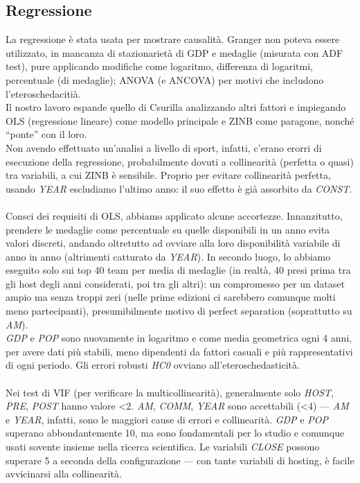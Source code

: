 \subsection{Regressione}\label{sec:methods_regression}

La regressione è stata usata per mostrare causalità. Granger non poteva essere
utilizzato, in mancanza di stazionarietà di GDP e medaglie (misurata con ADF
test), pure applicando modifiche come logaritmo, differenza di logaritmi,
percentuale (di medaglie); ANOVA (e ANCOVA) per motivi che includono
l'eteroschedacitià.\\

Il nostro lavoro espande quello di Csurilla\cite{csurillaLessObviousEffect2023}
analizzando altri fattori e impiegando OLS (regressione lineare) come modello
principale e ZINB come paragone, nonché ``ponte'' con il loro.\\
Non avendo effettuato un'analisi a livello di sport, infatti, c'erano erorri di
esecuzione della regressione, probabilmente dovuti a collinearità (perfetta o
quasi) tra variabili, a cui ZINB è sensibile. Proprio per evitare collinearità
perfetta, usando \textit{YEAR} escludiamo l'ultimo anno: il suo effetto è già
assorbito da \textit{CONST}.\\
\\
Consci dei requisiti di OLS, abbiamo applicato alcune accortezze. Innanzitutto,
prendere le medaglie come percentuale su quelle disponibili in un anno evita
valori discreti, andando oltretutto ad ovviare alla loro disponibilità variabile
di anno in anno (altrimenti catturato da \textit{YEAR}). In secondo luogo, lo
abbiamo eseguito solo sui top 40 team per media di medaglie (in realtà, 40 presi
prima tra gli host degli anni considerati, poi tra gli altri): un compromesso
per un dataset ampio ma senza troppi zeri (nelle prime edizioni ci sarebbero
comunque molti meno partecipanti), presumibilmente motivo di perfect
separation\cite{WikipediaSeparation} (soprattutto su \textit{AM}).\\
\textit{GDP} e \textit{POP} sono nuovamente in logaritmo e come media geometrica
ogni 4 anni, per avere dati più stabili, meno dipendenti da fattori casuali e
più rappresentativi di ogni periodo. Gli errori robusti \textit{HC0} ovviano
all'eteroschedasticità.\\
\\


Nei test di VIF (per verificare la multicollinearità), generalmente solo
\textit{HOST}, \textit{PRE}, \textit{POST} hanno valore <2. \textit{AM},
\textit{COMM}, \textit{YEAR} sono accettabili (<4) --- \textit{AM} e
\textit{YEAR}, infatti, sono le maggiori cause di errori e collinearità.
\textit{GDP} e \textit{POP} superano abbondantemente 10, ma sono fondamentali
per lo studio e comunque usati sovente insieme nella ricerca scientifica. Le
variabili \textit{CLOSE} possono superare 5 a seconda della configurazione ---
con tante variabili di hosting, è facile avvicinarsi alla collinearità.
